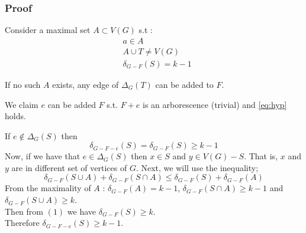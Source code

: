 \documentclass[8pt]{beamer}
\begin{document}
\begin{frame}
\frametitle{Proof}
Consider a maximal set $A\subset V(G)$ s.t :
\begin{subequations}
\begin{align}
    & a \in A \\ 
    & A \cup T \ne V(G) \\ 
    & \delta_{G-F}(S) = k - 1 
\end{align}
\end{subequations}

If no such $A$ exists, any edge of $\Delta_G(T)$ can be added to $F$.

\end{frame}

\begin{frame}
We claim $e$ can be added $F$ s.t. $F + e$ is an arborescence (trivial) and \eqref{eq:hyp} holds.


If $e\not\in \Delta_G(S)$ then $$\delta_{G-F-e}(S) = \delta_{G-F}(S) \ge k-1$$
Now, if we have that $e\in \Delta_G(S)$ then $x\in S$ and $y\in V(G)-S$. That is, $x$ and $y$ are in different set of vertices of $G$. Next, we will use the inequality; 
\begin{equation}\delta_{G-F}(S\cup A) + \delta_{G-F}(S\cap A) \le \delta_{G-F}(S) + \delta_{G-F}(A)\end{equation}
From the maximality of $A$ : $\delta_{G-F}(A)=k-1$, $\delta_{G-F}(S\cap A) \ge k-1$ and $\delta_{G-F}(S\cup A) \ge k$.\\
Then from $(1)$ we have $\delta_{G-F}(S) \ge k$.\\
Therefore $\delta_{G-F-e}(S) \ge k-1$.  
\eofproof
\end{frame}
\end{document}
